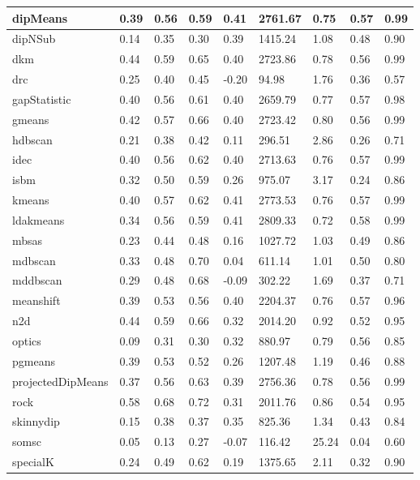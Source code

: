 \begin{table}[H]
\begin{tabular}{|l|l|l|l|l|l|l|l|l|}
\hline
dipMeans & 0.39 & 0.56 & 0.59 & 0.41 & 2761.67 & 0.75 & 0.57 & 0.99 \\
\hline
dipNSub & 0.14 & 0.35 & 0.30 & 0.39 & 1415.24 & 1.08 & 0.48 & 0.90 \\
\hline
dkm & 0.44 & 0.59 & 0.65 & 0.40 & 2723.86 & 0.78 & 0.56 & 0.99 \\
\hline
drc & 0.25 & 0.40 & 0.45 & -0.20 & 94.98 & 1.76 & 0.36 & 0.57 \\
\hline
gapStatistic & 0.40 & 0.56 & 0.61 & 0.40 & 2659.79 & 0.77 & 0.57 & 0.98 \\
\hline
gmeans & 0.42 & 0.57 & 0.66 & 0.40 & 2723.42 & 0.80 & 0.56 & 0.99 \\
\hline
hdbscan & 0.21 & 0.38 & 0.42 & 0.11 & 296.51 & 2.86 & 0.26 & 0.71 \\
\hline
idec & 0.40 & 0.56 & 0.62 & 0.40 & 2713.63 & 0.76 & 0.57 & 0.99 \\
\hline
isbm & 0.32 & 0.50 & 0.59 & 0.26 & 975.07 & 3.17 & 0.24 & 0.86 \\
\hline
kmeans & 0.40 & 0.57 & 0.62 & 0.41 & 2773.53 & 0.76 & 0.57 & 0.99 \\
\hline
ldakmeans & 0.34 & 0.56 & 0.59 & 0.41 & 2809.33 & 0.72 & 0.58 & 0.99 \\
\hline
mbsas & 0.23 & 0.44 & 0.48 & 0.16 & 1027.72 & 1.03 & 0.49 & 0.86 \\
\hline
mdbscan & 0.33 & 0.48 & 0.70 & 0.04 & 611.14 & 1.01 & 0.50 & 0.80 \\
\hline
mddbscan & 0.29 & 0.48 & 0.68 & -0.09 & 302.22 & 1.69 & 0.37 & 0.71 \\
\hline
meanshift & 0.39 & 0.53 & 0.56 & 0.40 & 2204.37 & 0.76 & 0.57 & 0.96 \\
\hline
n2d & 0.44 & 0.59 & 0.66 & 0.32 & 2014.20 & 0.92 & 0.52 & 0.95 \\
\hline
optics & 0.09 & 0.31 & 0.30 & 0.32 & 880.97 & 0.79 & 0.56 & 0.85 \\
\hline
pgmeans & 0.39 & 0.53 & 0.52 & 0.26 & 1207.48 & 1.19 & 0.46 & 0.88 \\
\hline
projectedDipMeans & 0.37 & 0.56 & 0.63 & 0.39 & 2756.36 & 0.78 & 0.56 & 0.99 \\
\hline
rock & 0.58 & 0.68 & 0.72 & 0.31 & 2011.76 & 0.86 & 0.54 & 0.95 \\
\hline
skinnydip & 0.15 & 0.38 & 0.37 & 0.35 & 825.36 & 1.34 & 0.43 & 0.84 \\
\hline
somsc & 0.05 & 0.13 & 0.27 & -0.07 & 116.42 & 25.24 & 0.04 & 0.60 \\
\hline
specialK & 0.24 & 0.49 & 0.62 & 0.19 & 1375.65 & 2.11 & 0.32 & 0.90 \\

\end{tabular}
\end{table}
